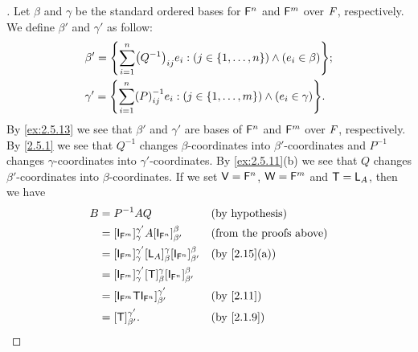 \begin{proof}[]
  Let \(\beta\) and \(\gamma\) be the standard ordered bases for \(\mathsf{F}^n\) and \(\mathsf{F}^m\) over \(\mathit{F}\), respectively.
  We define \(\beta'\) and \(\gamma'\) as follow:
  \begin{align*}
     & \beta' = \set{\sum_{i = 1}^n \pa{Q^{-1}}_{i j} e_i : (j \in \set{1, \dots, n}) \land (e_i \in \beta)};   \\
     & \gamma' = \set{\sum_{i = 1}^n \pa{P}^{-1}_{i j} e_i : (j \in \set{1, \dots, m}) \land (e_i \in \gamma)}.
  \end{align*}
  By \cref{ex:2.5.13} we see that \(\beta'\) and \(\gamma'\) are bases of \(\mathsf{F}^n\) and \(\mathsf{F}^m\) over \(\mathit{F}\), respectively.
  By \cref{2.5.1} we see that \(Q^{-1}\) changes \(\beta\)-coordinates into \(\beta'\)-coordinates and \(P^{-1}\) changes \(\gamma\)-coordinates into \(\gamma'\)-coordinates.
  By \cref{ex:2.5.11}(b) we see that \(Q\) changes \(\beta'\)-coordinates into \(\beta\)-coordinates.
  If we set \(\mathsf{V} = \mathsf{F}^n\), \(\mathsf{W} = \mathsf{F}^m\) and \(\mathsf{T} = \mathsf{L}_A\), then we have
  \begin{align*}
    B & = P^{-1} A Q                                                                                  &  & \text{(by hypothesis)}         \\
      & = [\IT[\vs{F}^m]]_{\gamma}^{\gamma'} A [\IT[\vs{F}^n]]_{\beta'}^{\beta}                       &  & \text{(from the proofs above)} \\
      & = [\IT[\vs{F}^m]]_{\gamma}^{\gamma'} [\L_A]_{\beta}^{\gamma} [\IT[\vs{F}^n]]_{\beta'}^{\beta} &  & \text{(by \cref{2.15}(a))}     \\
      & = [\IT[\vs{F}^m]]_{\gamma}^{\gamma'} [\T]_{\beta}^{\gamma} [\IT[\vs{F}^n]]_{\beta'}^{\beta}                                       \\
      & = [\IT[\vs{F}^m] \T \IT[\vs{F}^n]]_{\beta'}^{\gamma'}                                         &  & \text{(by \cref{2.11})}        \\
      & = [\T]_{\beta'}^{\gamma'}.                                                                    &  & \text{(by \cref{2.1.9})}
  \end{align*}
\end{proof}

